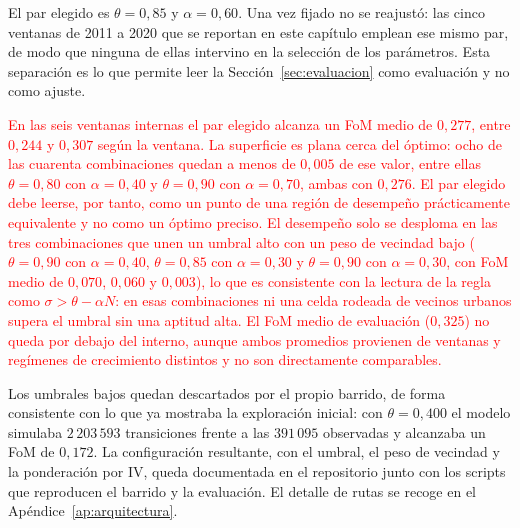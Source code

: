 El par elegido es $\theta = 0{,}85$ y $\alpha = 0{,}60$. Una vez fijado no se reajustó: las cinco ventanas de 2011 a 2020 que se reportan en este capítulo emplean ese mismo par, de modo que ninguna de ellas intervino en la selección de los parámetros. Esta separación es lo que permite leer la Sección~\ref{sec:evaluacion} como evaluación y no como ajuste.

\textcolor{red}{En las seis ventanas internas el par elegido alcanza un FoM medio de $0{,}277$, entre $0{,}244$ y $0{,}307$ según la ventana. La superficie es plana cerca del óptimo: ocho de las cuarenta combinaciones quedan a menos de $0{,}005$ de ese valor, entre ellas $\theta=0{,}80$ con $\alpha=0{,}40$ y $\theta=0{,}90$ con $\alpha=0{,}70$, ambas con $0{,}276$. El par elegido debe leerse, por tanto, como un punto de una región de desempeño prácticamente equivalente y no como un óptimo preciso. El desempeño solo se desploma en las tres combinaciones que unen un umbral alto con un peso de vecindad bajo ($\theta=0{,}90$ con $\alpha=0{,}40$, $\theta=0{,}85$ con $\alpha=0{,}30$ y $\theta=0{,}90$ con $\alpha=0{,}30$, con FoM medio de $0{,}070$, $0{,}060$ y $0{,}003$), lo que es consistente con la lectura de la regla como $\sigma>\theta-\alpha N$: en esas combinaciones ni una celda rodeada de vecinos urbanos supera el umbral sin una aptitud alta. El FoM medio de evaluación ($0{,}325$) no queda por debajo del interno, aunque ambos promedios provienen de ventanas y regímenes de crecimiento distintos y no son directamente comparables.}

Los umbrales bajos quedan descartados por el propio barrido, de forma consistente con lo que ya mostraba la exploración inicial: con $\theta = 0{,}400$ el modelo simulaba $2\,203\,593$ transiciones frente a las $391\,095$ observadas y alcanzaba un FoM de $0{,}172$. La configuración resultante, con el umbral, el peso de vecindad y la ponderación por IV, queda documentada en el repositorio junto con los scripts que reproducen el barrido y la evaluación. El detalle de rutas se recoge en el Apéndice~\ref{ap:arquitectura}.

